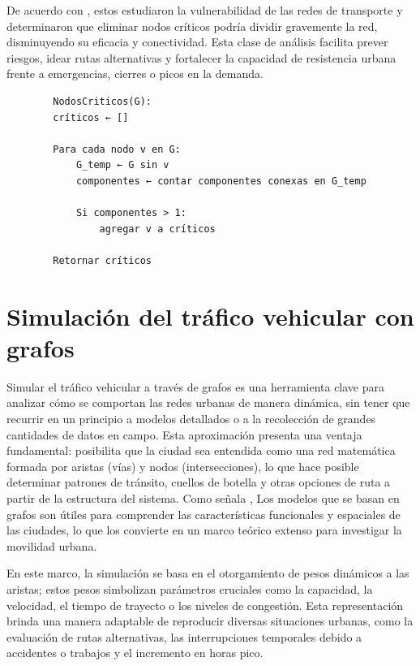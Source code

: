 De acuerdo con \cite{kurant_trainspotting_2006}, estos estudiaron la vulnerabilidad de las redes de transporte y determinaron que eliminar nodos críticos podría dividir 
gravemente la red, disminuyendo su eficacia y conectividad. Esta clase de análisis facilita prever riesgos, idear rutas alternativas y fortalecer la capacidad de resistencia 
urbana frente a emergencias, cierres o picos en la demanda.

\begin{listing}[H]
    \caption{Pseudocodigo del algoritmo de centralidad de grado}
    \label{lst:critical-nodes}
    \begin{verbatim}
        NodosCriticos(G):
        críticos ← []

        Para cada nodo v en G:
            G_temp ← G sin v
            componentes ← contar componentes conexas en G_temp

            Si componentes > 1:
                agregar v a críticos

        Retornar críticos
    \end{verbatim}
\end{listing}

\section{Simulación del tráfico vehicular con grafos}
Simular el tráfico vehicular a través de grafos es una herramienta clave para analizar cómo se comportan las redes urbanas de manera dinámica, sin tener que recurrir en un 
principio a modelos detallados o a la recolección de grandes cantidades de datos en campo. Esta aproximación presenta una ventaja fundamental: posibilita que la ciudad sea 
entendida como una red matemática formada por aristas (vías) y nodos (intersecciones), lo que hace posible determinar patrones de tránsito, cuellos de botella y otras opciones 
de ruta a partir de la estructura del sistema. Como señala \cite{barthelemy_spatial_2011}, Los modelos que se basan en grafos son útiles para comprender las características funcionales y 
espaciales de las ciudades, lo que los convierte en un marco teórico extenso para investigar la movilidad urbana.

En este marco, la simulación se basa en el otorgamiento de pesos dinámicos a las aristas; estos pesos simbolizan parámetros cruciales como la capacidad, la velocidad, el tiempo 
de trayecto o los niveles de congestión. Esta representación brinda una manera adaptable de reproducir diversas situaciones urbanas, como la evaluación de rutas alternativas, 
las interrupciones temporales debido a accidentes o trabajos y el incremento en horas pico.

